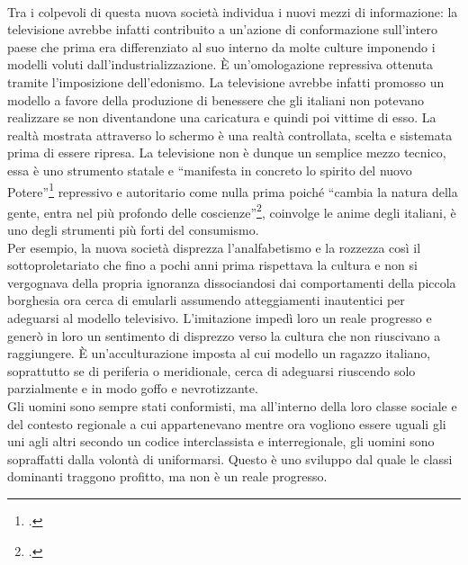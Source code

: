 \paragraph{}Tra i colpevoli di questa nuova società individua i nuovi mezzi di informazione: la televisione avrebbe infatti contribuito a un'azione di conformazione sull'intero paese che prima era differenziato al suo interno da molte culture imponendo i modelli voluti dall'industrializzazione.
È un'omologazione repressiva ottenuta tramite l'imposizione dell'edonismo.
La televisione avrebbe infatti promosso un modello a favore della produzione di benessere che gli italiani non potevano realizzare se non diventandone una caricatura e quindi poi vittime di esso.
La realtà mostrata attraverso lo schermo è una realtà controllata, scelta e sistemata prima di essere ripresa.
La televisione non è dunque un semplice mezzo tecnico, essa è uno strumento statale e \enquote{manifesta in concreto lo spirito del nuovo Potere}\footcite{Scritti1} repressivo e autoritario come nulla prima poiché \enquote{cambia la natura della gente, entra nel più profondo delle coscienze}\footcite{Scritti4}, coinvolge le anime degli italiani, è uno degli strumenti più forti del consumismo.
\\Per esempio, la nuova società disprezza l'analfabetismo e la rozzezza così il sottoproletariato che fino a pochi anni prima rispettava la cultura e non si vergognava della propria ignoranza dissociandosi dai comportamenti della piccola borghesia ora cerca di emularli assumendo atteggiamenti inautentici per adeguarsi al modello televisivo.
L'imitazione impedì loro un reale progresso e generò in loro un sentimento di disprezzo verso la cultura che non riuscivano a raggiungere.
È un'acculturazione imposta al cui modello un ragazzo italiano, soprattutto se di periferia o meridionale, cerca di adeguarsi riuscendo solo parzialmente e in modo goffo e nevrotizzante. 
\\Gli uomini sono sempre stati conformisti, ma all'interno della loro classe sociale e del contesto regionale a cui appartenevano mentre ora vogliono essere uguali gli uni agli altri secondo un codice interclassista e interregionale, gli uomini sono sopraffatti dalla volontà di uniformarsi.
Questo è uno sviluppo dal quale le classi dominanti traggono profitto, ma non è un reale progresso.

